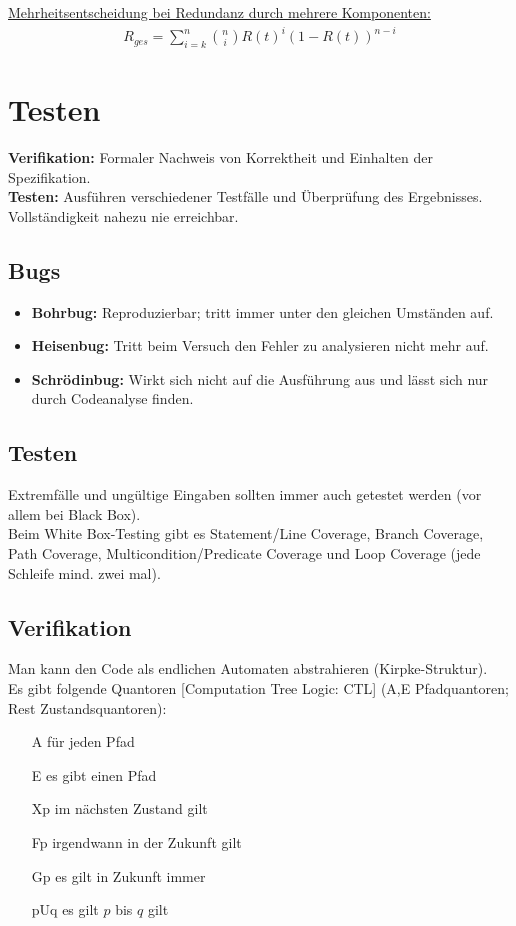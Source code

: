 			\underline{Mehrheitsentscheidung bei Redundanz durch mehrere Komponenten:}
			\begin{align*}
				R_{ges}=\sum\limits_{i=k}^n\binom{n}{i}R(t)^i(1-R(t))^{n-i}
			\end{align*}
			
	\chapter{Testen}
		\textbf{Verifikation:} Formaler Nachweis von Korrektheit und Einhalten der Spezifikation.\\
		\textbf{Testen:} Ausführen verschiedener Testfälle und Überprüfung des Ergebnisses. Vollständigkeit nahezu nie erreichbar.
		
		\section{Bugs}
			\begin{itemize}
				\item \textbf{Bohrbug:} Reproduzierbar; tritt immer unter den gleichen Umständen auf.
				\item \textbf{Heisenbug:} Tritt beim Versuch den Fehler zu analysieren nicht mehr auf.
				\item \textbf{Schrödinbug:} Wirkt sich nicht auf die Ausführung aus und lässt sich nur durch Codeanalyse finden.
			\end{itemize}
			
		\section{Testen}
			Extremfälle und ungültige Eingaben sollten immer auch getestet werden (vor allem bei Black Box).\\Beim White Box-Testing gibt es Statement/Line Coverage, Branch Coverage, Path Coverage, Multicondition/Predicate Coverage und Loop Coverage (jede Schleife mind. zwei mal).
		
		\section{Verifikation}
		Man kann den Code als endlichen Automaten abstrahieren (Kirpke-Struktur).\\
		Es gibt folgende Quantoren [Computation Tree Logic: CTL] (A,E Pfadquantoren; Rest Zustandsquantoren):
		\begin{itemize}
			\item[A] für jeden Pfad
			\item[E] es gibt einen Pfad
			\item[Xp] im nächsten Zustand gilt
			\item[Fp] irgendwann in der Zukunft gilt
			\item[Gp] es gilt in Zukunft immer
			\item[pUq] es gilt $p$ bis $q$ gilt
		\end{itemize}
